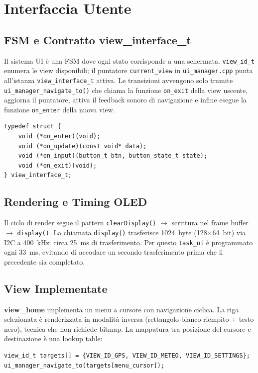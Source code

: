 \newpage

\section{Interfaccia Utente}


\subsection{FSM e Contratto view\_interface\_t}

Il sistema UI è una FSM dove ogni stato corrisponde a una schermata.
\texttt{view\_id\_t} enumera le view disponibili; il puntatore
\texttt{current\_view} in \texttt{ui\_manager.cpp} punta all'istanza
\texttt{view\_interface\_t} attiva. Le transizioni avvengono solo tramite
\texttt{ui\_manager\_navigate\_to()} che chiama la funzione \texttt{on\_exit} della
view uscente, aggiorna il puntatore, attiva il feedback sonoro di navigazione
e infine esegue la funzione \texttt{on\_enter} della nuova view.

\begin{lstlisting}[caption={view\_definitions.h --- contratto funzionale di una view}]
typedef struct {
    void (*on_enter)(void);
    void (*on_update)(const void* data);
    void (*on_input)(button_t btn, button_state_t state);
    void (*on_exit)(void);
} view_interface_t;
\end{lstlisting}


\subsection{Rendering e Timing OLED}

Il ciclo di render segue il pattern \texttt{clearDisplay()} $\to$ scrittura
nel frame buffer $\to$ \texttt{display()}. La chiamata \texttt{display()}
trasferisce 1024~byte (128$\times$64~bit) via I2C a 400~kHz: circa 25~ms di
trasferimento. Per questo \texttt{task\_ui} è programmato ogni 33~ms,
evitando di accodare un secondo trasferimento prima che il precedente sia
completato.

\subsection{View Implementate}

\textbf{view\_home} implementa un menu a cursore con navigazione ciclica.
La riga selezionata è renderizzata in modalità inversa
(rettangolo bianco riempito + testo nero), tecnica che non richiede bitmap.
La mappatura tra posizione del cursore e destinazione è una lookup table:
\begin{lstlisting}
view_id_t targets[] = {VIEW_ID_GPS, VIEW_ID_METEO, VIEW_ID_SETTINGS};
ui_manager_navigate_to(targets[menu_cursor]);
\end{lstlisting}

